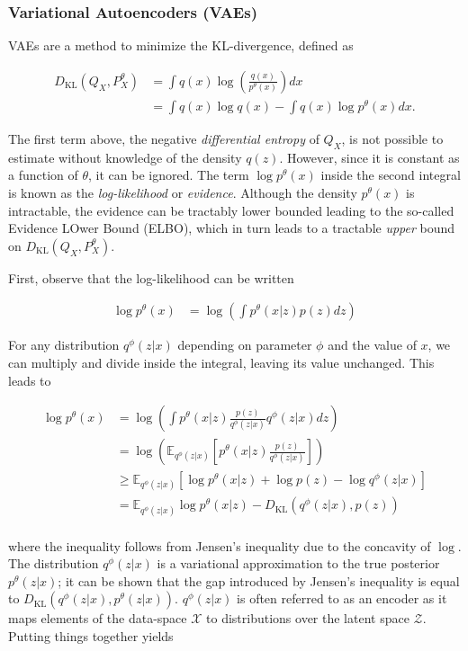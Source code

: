 \subsubsection{Variational Autoencoders (VAEs)}

VAEs \cite{kingma, rezende} are a method to minimize the KL-divergence, defined as

\begin{align*}
D_{\text{KL}}(Q_X, P^\theta_X) &= \int q(x) \log \left( \frac{q(x)}{p^\theta(x)} \right) dx \\
&= \int q(x) \log q(x) - \int q(x) \log p^\theta(x) dx.
\end{align*}

The first term above, the negative \emph{differential entropy} of $Q_X$, is not possible to estimate without knowledge of the density $q(z)$.
However, since it is constant as a function of $\theta$, it can be ignored.
The term $\log p^\theta(x)$ inside the second integral is known as the \emph{log-likelihood} or \emph{evidence}. 
Although the density $p^\theta(x)$ is intractable, the evidence can be tractably lower bounded leading to the so-called Evidence LOwer Bound (ELBO), which in turn leads to a tractable \emph{upper} bound on $D_{\text{KL}}(Q_X, P^\theta_X)$. 

First, observe that the log-likelihood can be written 

\begin{align*}
\log p^\theta(x) &= \log \left( \int p^\theta(x|z) p(z) dz \right)
\end{align*}

For any distribution $q^\phi(z|x)$ depending on parameter $\phi$ and the value of $x$, we can multiply and divide inside the integral, leaving its value unchanged.
This leads to

\begin{align*}
\log p^\theta(x) &= \log \left( \int p^\theta(x|z) \frac{p(z)}{q^\phi(z|x)} q^\phi(z|x) dz \right) \\
&= \log \left( \mathbb{E}_{q^\phi(z|x)} \left[  p^\theta(x|z) \frac{p(z)}{q^\phi(z|x)} \right]\right) \\
&\geq \mathbb{E}_{q^\phi(z|x)} \left[ \log p^\theta(x|z) + \log p(z) - \log q^\phi(z|x) \right] \\
&= \mathbb{E}_{q^\phi(z|x)} \log p^\theta(x|z)  - D_{\text{KL}}\left(q^\phi(z|x), p(z)\right) \\
\end{align*}

where the inequality follows from Jensen's inequality due to the concavity of $\log$.
The distribution $q^\phi(z|x)$ is a variational approximation to the true posterior $p^\theta(z|x)$; it can be shown that the gap introduced by Jensen's inequality is equal to $D_{\text{KL}}\left(q^\phi(z|x), p^\theta(z|x)\right)$. 
$q^\phi(z|x)$ is often referred to as an encoder as it maps elements of the data-space $\mathcal{X}$ to distributions over the latent space $\mathcal{Z}$.
Putting things together yields

